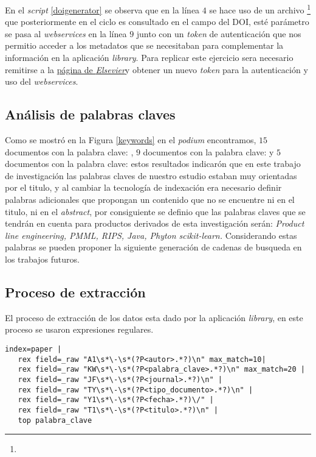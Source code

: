   En el \textit{script} \ref{doigenerator} se observa que en la línea $4$ se hace uso de un archivo \footnote{ } que posteriormente en el ciclo es consultado en el campo del DOI, esté parámetro se pasa al \textit{webservices} en la línea $9$ junto con un \textit{token} de autenticación que nos permitio acceder a los metadatos que se necesitaban para complementar la información en la aplicación \textit{library}. Para replicar este ejercicio sera necesario remitirse a la  \href{https://dev.elsevier.com/api_docs.html}{página de \textit{Elsevier}}y obtener un nuevo \textit{token} para la autenticación y uso del \textit{webservices}.
  
  \subsection{Análisis de palabras claves}
  Como se mostró en la Figura \ref{keywords} en el \textit{podium} encontramos, $15$ documentos con la palabra clave: ,   $9$ documentos con la palabra clave:  y  $5$ documentos con la palabra clave:  estos resultados indicarón que en este trabajo de investigación las palabras claves de nuestro estudio estaban muy orientadas por el titulo, y al cambiar la tecnología de indexación era necesario definir palabras adicionales que propongan un contenido que no se encuentre ni en el titulo, ni en el \textit{abstract},  por consiguiente se definio que las palabras claves que se tendrán en cuenta para productos derivados de esta investigación serán: \textit{Product line engineering, PMML, RIPS, Java, Phyton scikit-learn.} Considerando estas palabras se pueden proponer la siguiente generación de cadenas de busqueda en los trabajos futuros.

   \subsection{Proceso de extracción}
   El proceso de extracción de los datos esta dado por la aplicación \textit{library}, en este proceso se usaron expresiones regulares.
   \begin{lstlisting}[frame=single,label=regex, title=\textbf{regex}, caption= Ejemplo de regex en Splunk]  index=paper | 
   rex field=_raw "A1\s*\-\s*(?P<autor>.*?)\n" max_match=10| 
   rex field=_raw "KW\s*\-\s*(?P<palabra_clave>.*?)\n" max_match=20 | 
   rex field=_raw "JF\s*\-\s*(?P<journal>.*?)\n" | 
   rex field=_raw "TY\s*\-\s*(?P<tipo_documento>.*?)\n" |
   rex field=_raw "Y1\s*\-\s*(?P<fecha>.*?)\/" | 
   rex field=_raw "T1\s*\-\s*(?P<titulo>.*?)\n" | 
   top palabra_clave
   \end{lstlisting}
   
